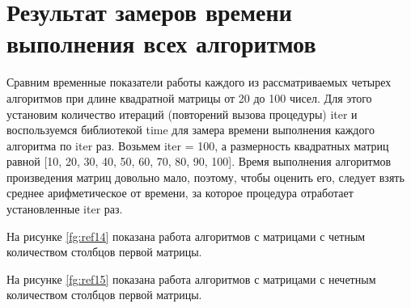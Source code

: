 \documentclass[12pt]{report}
\begin{document}
\section{Результат замеров времени выполнения всех алгоритмов} 

Сравним временные показатели работы каждого из рассматриваемых четырех алгоритмов при длине квадратной матрицы от 20 до 100 чисел. Для этого установим количество итераций (повторений вызова процедуры) iter и воспользуемся библиотекой time для замера времени выполнения каждого алгоритма по iter раз. Возьмем iter = 100, а размерность квадратных матриц равной [10, 20, 30, 40, 50, 60, 70, 80, 90, 100]. Время выполнения алгоритмов произведения матриц довольно мало, поэтому, чтобы оценить его, следует взять среднее арифметическое от времени, за которое процедура отработает установленные iter раз. 

На рисунке \ref{fg:ref14} показана работа алгоритмов с матрицами с четным количеством столбцов первой матрицы.

\begin{figure}[ht!]
\end{figure}

На рисунке \ref{fg:ref15} показана работа алгоритмов с матрицами с нечетным количеством столбцов первой матрицы.

\begin{figure}[ht!]
\end{figure}
\end{document}

